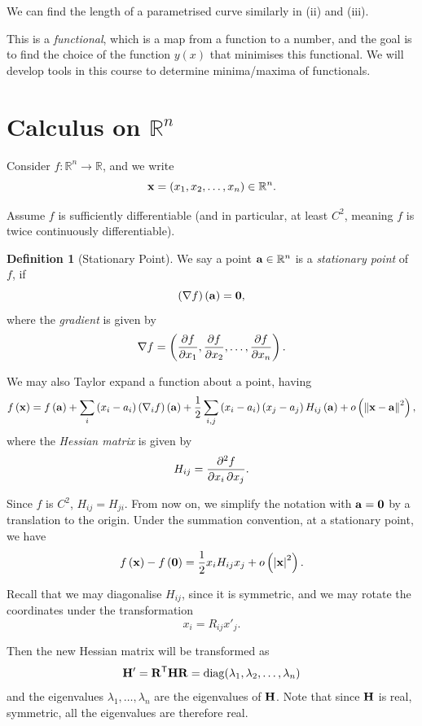 \documentclass[11pt]{article}
\numberwithin{equation}{section}
\theoremstyle{definition}
\newtheorem{definition}[theorem]{Definition}
\theoremstyle{remark}
\newcommand{\pqty}[1]{\left(#1\right)}
\newcommand{\abs}[1]{\left|#1\right|}
\newcommand{\norm}[1]{\left\lVert#1\right\rVert}
\newcommand{\functiondomain}[3]{#1:#2\to #3}
\newcommand{\RR}{\mathbb{R}}
\newcommand{\transpose}{^{\mathsf{T}}}
\newcommand{\grad}{\nabla}
\newcommand{\contClass}[1]{C^{#1}}
\DeclareMathOperator{\diag}{diag}
\begin{document}
We can find the length of a parametrised curve similarly in (ii) and (iii).

This is a \emph{functional}, which is a map from a function to a number, and the goal is to find the choice of the function \(y\pqty{x}\) that minimises this functional. We will develop tools in this course to determine minima/maxima  of functionals.

\section{Calculus on \(\RR^n\)}

Consider \(\functiondomain{f}{\RR^n}{\RR}\), and we write
\[
    \vb{x} = \pqty{x_1, x_2, \ldots, x_n} \in \RR^n.
\]

Assume \(f\) is sufficiently differentiable (and in particular, at least \(\contClass{2}\), meaning \(f\) is twice continuously differentiable).

\begin{definition}[Stationary Point]\label{variation-unit-0002}
    \label{def:stationary-point}%
    We say a point \(\vb{a} \in \RR^n\) is a \emph{stationary point} of \(f\), if
    \[
        \pqty{\grad f} \pqty{\vb{a}} = \vb{0},
    \]
    where the \emph{gradient} is given by
    \[
        \grad f = \pqty{\pdv{f}{x_1}, \pdv{f}{x_2}, \ldots, \pdv{f}{x_n}}.
    \]
\end{definition}

We may also Taylor expand a function about a point, having
\[
    f\pqty{\vb{x}} = f\pqty{\vb{a}} + \sum_{i} \pqty{x_i - a_i} \pqty{\nabla_i f} \pqty{\vb{a}} + \frac{1}{2} \sum_{i, j} \pqty{x_i - a_i} \pqty{x_j - a_j} H_{ij} \pqty{\vb{a}} + o\pqty{\norm{\vb{x} - \vb{a}}^2},
\]
where the \emph{Hessian matrix} is given by
\[
    H_{ij} = \pdv{f}{x_i}{x_j}.
\]

Since \(f\) is \(\contClass{2}\), \(H_{ij} = H_{ji}\). From now on, we simplify the notation with \(\vb{a} = \vb{0}\) by a translation to the origin. Under the summation convention, at a stationary point, we have
\[
    f\pqty{\vb{x}} - f\pqty{\vb{0}} = \frac{1}{2} x_i H_{ij} x_j + o\pqty{\abs{\vb{x}}^2}.
\]

Recall that we may diagonalise \(H_{ij}\), since it is symmetric, and we may rotate the coordinates under the transformation
\[
    x_i = R_{ij} x'_{j}.
\]

Then the new Hessian matrix will be transformed as
\[
    \vb{H}' = \vb{R}\transpose \vb{H} \vb{R} = \diag(\lambda_1,\lambda_2,\ldots,\lambda_n)
\]
and the eigenvalues \(\lambda_1, \ldots, \lambda_n\) are the eigenvalues of \(\vb{H}\). Note that since \(\vb{H}\) is real, symmetric, all the eigenvalues are therefore real.
\end{document}
